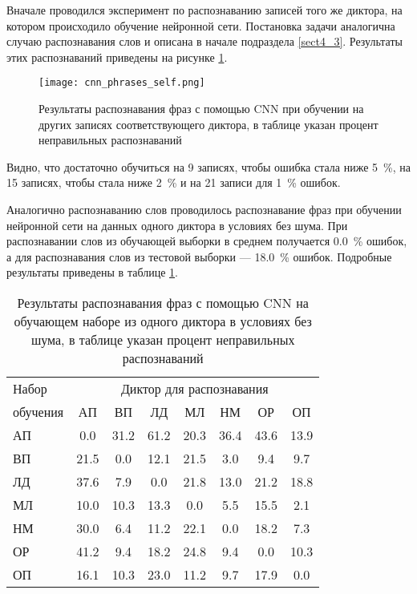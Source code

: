 Вначале проводился эксперимент по распознаванию записей того же диктора, на котором происходило обучение нейронной сети.
Постановка задачи аналогична случаю распознавания слов и описана в начале подраздела \ref{sect4_3}.
Результаты этих распознаваний приведены на рисунке \ref{fig:cnn_phrases_self}.

\begin{figure}[h]
	\centering
	\texttt{[image: cnn\_phrases\_self.png]}
	\caption{Результаты распознавания фраз с помощью CNN при обучении на других записях соответствующего диктора, в таблице указан процент неправильных распознаваний}
	\label{fig:cnn_phrases_self}
\end{figure}

Видно, что достаточно обучиться на 9 записях, чтобы ошибка стала ниже 5~\%, на 15 записях, чтобы стала ниже 2~\% и на 21 записи для 1~\% ошибок.

Аналогично распознаванию слов проводилось распознавание фраз при обучении нейронной сети на данных одного диктора в условиях без шума.
При распознавании слов из обучающей выборки в среднем получается 0.0~\% ошибок, а для распознавания слов из тестовой выборки --- 18.0~\% ошибок.
Подробные результаты приведены в таблице \ref{tab:cnn_phrases_1dictor}.

\begin{table}[h]
	\centering
	\caption{Результаты распознавания фраз с помощью CNN на обучающем наборе из одного диктора в условиях без шума, в таблице указан процент неправильных распознаваний}
	\label{tab:cnn_phrases_1dictor}
	\begin{tabular}{| l | c | c | c | c | c | c | c |}
		\hline
		Набор & \multicolumn{7}{c|}{Диктор для распознавания} \\
		\hhline{~-------}
		обучения \phantom{0000} & \phantom{0} АП \phantom{0} & \phantom{0} ВП \phantom{0} & \phantom{0} ЛД \phantom{0} & \phantom{0} МЛ \phantom{0} & \phantom{0} НМ \phantom{0} & \phantom{0} ОР \phantom{0} & \phantom{0} ОП \phantom{0} \\
		\hline
		АП 		 &  0.0 & 31.2 & 61.2 & 20.3 & 36.4 & 43.6 & 13.9 \\
		ВП 		 & 21.5 &  0.0 & 12.1 & 21.5 &  3.0 &  9.4 &  9.7 \\
		ЛД 		 & 37.6 &  7.9 &  0.0 & 21.8 & 13.0 & 21.2 & 18.8 \\
		МЛ 		 & 10.0 & 10.3 & 13.3 &  0.0 &  5.5 & 15.5 &  2.1 \\
		НМ 		 & 30.0 &  6.4 & 11.2 & 22.1 &  0.0 & 18.2 &  7.3 \\
		ОР 		 & 41.2 &  9.4 & 18.2 & 24.8 &  9.4 &  0.0 & 10.3 \\
		ОП 		 & 16.1 & 10.3 & 23.0 & 11.2 &  9.7 & 17.9 &  0.0 \\
		\hline
	\end{tabular}
\end{table}

